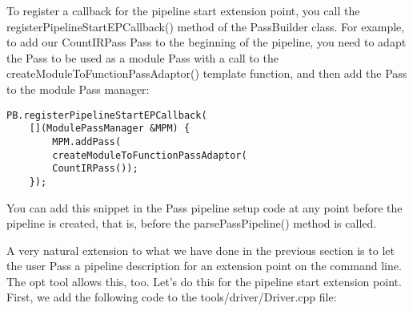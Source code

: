 To register a callback for the pipeline start extension point, you call the registerPipelineStartEPCallback() method of the PassBuilder class. For example, to add our CountIRPass Pass to the beginning of the pipeline, you need to adapt the Pass to be used as a module Pass with a call to the createModuleToFunctionPassAdaptor() template function, and then add the Pass to the module Pass manager:\par

\begin{lstlisting}[caption={}]
PB.registerPipelineStartEPCallback(
	[](ModulePassManager &MPM) {
		MPM.addPass(
		createModuleToFunctionPassAdaptor(
		CountIRPass());
	});
\end{lstlisting}

You can add this snippet in the Pass pipeline setup code at any point before the pipeline is created, that is, before the parsePassPipeline() method is called.\par

A very natural extension to what we have done in the previous section is to let the user Pass a pipeline description for an extension point on the command line. The opt tool allows this, too. Let's do this for the pipeline start extension point. First, we add the following code to the tools/driver/Driver.cpp file:\par


